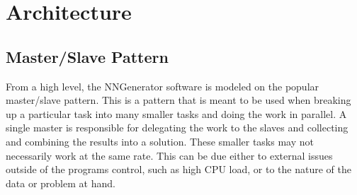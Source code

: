 \chapter[Architecture]{Architecture}

\section{Master/Slave Pattern}
From a high level, the NNGenerator software is modeled on the popular master/slave pattern. 
This is a pattern that is meant to be used when breaking up a particular task into many smaller tasks and doing the work in parallel.
A single master is responsible for delegating the work to the slaves and collecting and combining the results into a solution.
These smaller tasks may not necessarily work at the same rate.
This can be due either to external issues outside of the programs control, such as high CPU load, or to the nature of the data or problem at hand.

